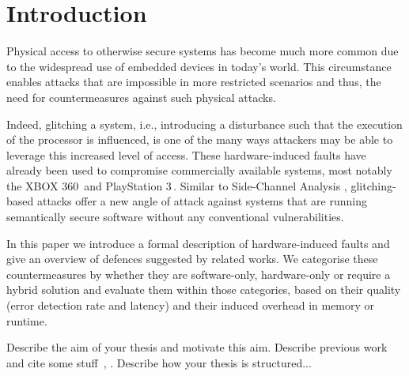 %
%

\chapter{Introduction}
Physical access to otherwise secure systems has become much more common due to the widespread use of embedded devices in today's world. This circumstance enables attacks that are impossible in more restricted scenarios and thus, the need for countermeasures against such physical attacks. 

Indeed, glitching a system, i.e., introducing a disturbance such that the execution of the processor is influenced, is one of the many ways attackers may be able to leverage this increased level of access. These hardware-induced faults have already been used to compromise commercially available systems, most notably the XBOX 360\,\cite{free60} and PlayStation 3\,\cite{ps3hyper}. Similar to Side-Channel Analysis , glitching-based attacks offer a new angle of attack against systems that are running semantically secure software without any conventional vulnerabilities.

In this paper we introduce a formal description of hardware-induced faults and give an overview of  defences suggested by related works. We categorise these countermeasures by whether they are software-only, hardware-only or require a hybrid solution and evaluate them within those categories, based on their quality (error detection rate and latency) and their induced overhead in memory or runtime.

Describe the aim of your thesis and motivate this aim. Describe previous work and cite some stuff~\cite{Bay1, Ernst}, . Describe how your thesis is structured...
